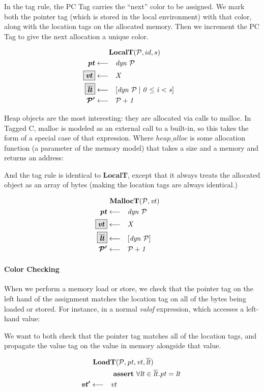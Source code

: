 \documentclass[acmsmall,review,anonymous]{acmart}\settopmatter{printfolios=true,printccs=false,printacmref=false}
\begin{document}
In the tag rule, the PC Tag carries the ``next'' color to be assigned. We mark both the pointer tag
(which is stored in the local environment) with that color, along with the location tags on the
allocated memory. Then we increment the PC Tag to give the next allocation a unique color.

\[\begin{aligned}
\truledef{\localt}
\settag{\pt}{dyn ~ \PCT}
\settagopt{\vt}{X}
\settagopt{\overline{\lt}}{\left[dyn ~ \PCT \mid 0 \leq i < s\right]}
\settag{\PCT'}{\PCT+1}
\end{aligned}\]
         
Heap objects are the most interesting: they are allocated via calls to malloc.
In Tagged C, malloc is modeled as an external call to a built-in, so this takes the form
of a special case of that expression. Where \(\mathit{heap\_alloc}\) is some allocation
function (a parameter of the memory model) that takes a size and a memory and returns an address:

\allocstep

And the tag rule is identical to \(\mathbf{LocalT}\), except that it always treats the allocated
object as an array of bytes (making the location tags are always identical.)

\[\begin{aligned}
\truledef{\malloct}
\settag{\pt}{dyn ~ \PCT}
\settagopt{\vt}{X}
\settagopt{\overline{\lt}}{\left[dyn ~ \PCT\right]}
\settag{\PCT'}{\PCT + 1}
\end{aligned}\]

\paragraph*{Color Checking}

When we perform a memory load or store, we check that the pointer tag on the left hand
of the assignment matches the location tag on all of the bytes being loaded or stored.
For instance, in a normal {\it valof} expression, which accesses a left-hand value:

\valofstep

We want to both check that the pointer tag matches all of the location tags, and propagate the
value tag on the value in memory alongside that value.

\[\begin{aligned}
\truledef{\loadt}
\assert{\forall \lt \in \overline{\lt} . \pt = \lt}
\settag{\vt'}{\vt}
\end{aligned}\]
\end{document}
